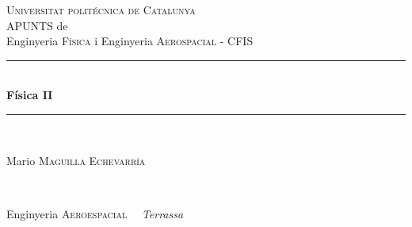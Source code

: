 \documentclass[11pt]{article}
\begin{document}
\begin{titlepage}

\newcommand{\HRule}{\rule{\linewidth}{0.5mm}} %

\center %
 

\textsc{\LARGE Universitat politécnica de Catalunya}\\[1.5cm] %
APUNTS de\\[0.3cm]
Enginyeria \textsc{\Large Física} i Enginyeria \textsc{\Large Aerospacial - CFIS}\\[0.5cm] %


\HRule \\[0.4cm]
{ \huge \bfseries
Física II
}\\[0.4cm] %
\HRule \\[1.5cm]
 

\begin{minipage}{0.4\textwidth}
\begin{flushleft} \large

Mario \textsc{Maguilla Echevarría}  \\
\end{flushleft}
\end{minipage}
~
\begin{minipage}{0.4\textwidth}
\begin{flushright} \large
Enginyeria \textsc{Aeroespacial} \ \ \textit{Terrassa}
\end{flushright}
\end{minipage}\\[2cm]


\end{titlepage}
\end{document}
